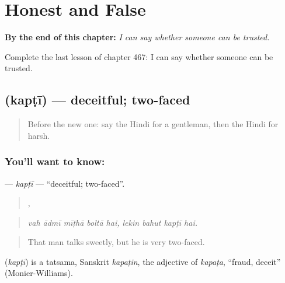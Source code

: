 
\chapter{Honest and False}
\label{ch:hi-honest-and-false}

\begin{chapteropening}
\textbf{By the end of this chapter:} \emph{I can say whether someone can be trusted.}

Complete the last lesson of chapter 467: I can say whether someone can be trusted.
\end{chapteropening}

\section[\texorpdfstring{\hi{कपटी} (kapṭī)}{कपटी (kapṭī)}]{ (kapṭī) — deceitful; two-faced}

\label{lesson:HI-C467-kapti}



\begin{quote}
Before the new one: say the Hindi for a gentleman, then the Hindi for harsh.
\end{quote}

\subsection*{You'll want to know: }
\textbf{} — \emph{kapṭī} — \textquotedblleft{}deceitful; two-faced\textquotedblright{}.

\begin{quote}
    ,    
\end{quote}

\begin{quote}
\emph{vah ādmī mīṭhā boltā hai, lekin bahut kapṭī hai.}
\end{quote}

\begin{quote}
That man talks sweetly, but he is very two-faced.
\end{quote}

\begin{cousinweb}
\textbf{} (\emph{kapṭī}) is a tatsama, Sanskrit \emph{kapaṭin}, the adjective of \emph{kapaṭa}, \textquotedblleft{}fraud, deceit\textquotedblright{} (Monier-Williams).
\end{cousinweb}

